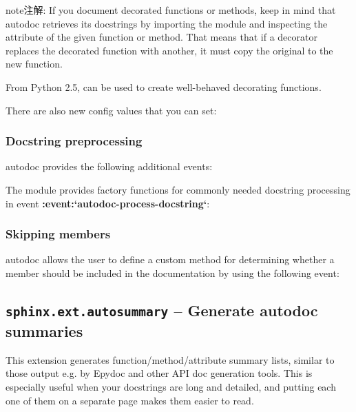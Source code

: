 \documentclass[letterpaper,10pt,english]{sphinxmanual}
\begin{document}
\begin{fulllineitems}
\begin{notice}{note}{注解:}
If you document decorated functions or methods, keep in mind that autodoc
retrieves its docstrings by importing the module and inspecting the
 attribute of the given function or method.  That means that if
a decorator replaces the decorated function with another, it must copy the
original  to the new function.

From Python 2.5,  can be used to create
well-behaved decorating functions.
\end{notice}

\end{fulllineitems}


There are also new config values that you can set:


\subsubsection{Docstring preprocessing}
\label{ext/autodoc:docstring-preprocessing}
autodoc provides the following additional events:

The {\hyperref[ext/autodoc:module\string-sphinx.ext.autodoc]{}} module provides factory functions for commonly
needed docstring processing in event {\color{red}\bfseries{}:event:{}`autodoc-process-docstring{}`}:


\subsubsection{Skipping members}
\label{ext/autodoc:skipping-members}
autodoc allows the user to define a custom method for determining whether a
member should be included in the documentation by using the following event:


\subsection{\texttt{sphinx.ext.autosummary} -- Generate autodoc summaries}
\label{ext/autosummary::doc}\label{ext/autosummary:module-sphinx.ext.autosummary}\label{ext/autosummary:sphinx-ext-autosummary-generate-autodoc-summaries}

This extension generates function/method/attribute summary lists, similar to
those output e.g. by Epydoc and other API doc generation tools.  This is
especially useful when your docstrings are long and detailed, and putting each
one of them on a separate page makes them easier to read.
\end{document}
